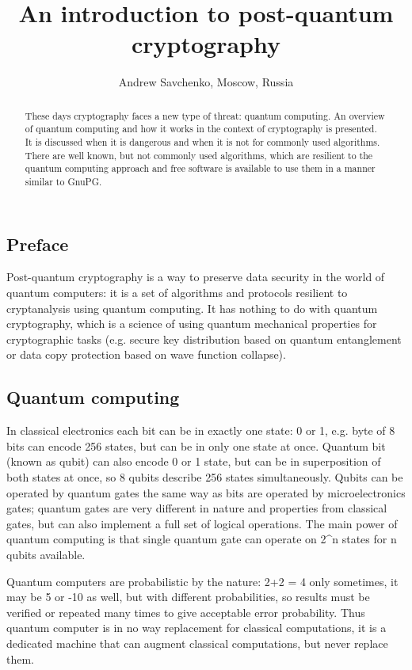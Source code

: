 \documentclass[10pt, a5paper]{article}
\begin{document}
\title{An introduction to post-quantum cryptography}
\author{Andrew Savchenko, Moscow, Russia}
\maketitle
\begin{abstract}
These days cryptography faces a new type of threat: quantum
computing. An overview of quantum computing and how it works in the context of cryptography is presented. It is discussed when it is dangerous and when it is not for commonly used algorithms. There are well known, but not commonly used algorithms, which are resilient to the quantum computing approach and free software is available to use them in a manner similar to GnuPG.
\end{abstract}
\subsection*{Preface}

Post-quantum cryptography is a way to preserve data security in the world of quantum computers: it is a set of algorithms and protocols resilient to cryptanalysis using quantum computing\footnotemark[1]. It has nothing to do with quantum cryptography, which is a science of using quantum mechanical properties for cryptographic tasks (e.g. secure key distribution based on quantum entanglement or data copy protection based on wave function collapse).

\subsection*{Quantum computing}

In classical electronics each bit can be in exactly one state: 0 or 1, e.g. byte of 8 bits can encode 256 states, but can be in only one state at once. Quantum bit (known as qubit) can also encode 0 or 1 state, but can be in superposition of both states at once, so 8 qubits describe 256 states simultaneously. Qubits can be operated by quantum gates the same way as bits are operated by microelectronics gates; quantum gates are very different in nature and properties from classical gates, but can also implement a full set of logical operations. The main power of quantum computing is that single quantum gate can operate on 2\^{}n states for n qubits available.

Quantum computers are probabilistic by the nature: 2+2 = 4 only sometimes, it may be 5 or -10 as well, but with different probabilities, so results must be verified or repeated many times to give acceptable error probability. Thus quantum computer is in no way replacement for classical computations, it is a dedicated machine that can augment classical computations, but never replace them.
\end{document}
